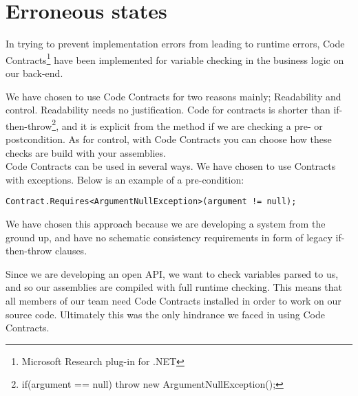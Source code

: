 \documentclass[../report.tex]{subfiles}
\begin{document}
\section{Erroneous states}

In trying to prevent implementation errors from leading to runtime errors, Code Contracts\footnote{Microsoft Research plug-in for .NET} have been implemented for variable checking in the business logic on our back-end.

We have chosen to use Code Contracts for two reasons mainly; Readability and control. Readability needs no justification. Code for contracts is shorter than if-then-throw\footnote{if(argument == null) throw new ArgumentNullException();}, and it is explicit from the method if we are checking a pre- or postcondition. As for control, with Code Contracts you can choose how these checks are build with your assemblies. \\

Code Contracts can be used in several ways. We have chosen to use Contracts with  exceptions. Below is an example of a pre-condition:

 \texttt{Contract.Requires<ArgumentNullException>(argument != null);}
 
We have chosen this approach because we are developing a system from the ground up, and have no schematic consistency requirements in form of legacy if-then-throw clauses.

Since we are developing an open API, we want to check variables parsed to us, and so our assemblies are compiled with full runtime checking. This means that all members of our team need Code Contracts installed in order to work on our source code. Ultimately this was the only hindrance we faced in using Code Contracts.
\end{document}

